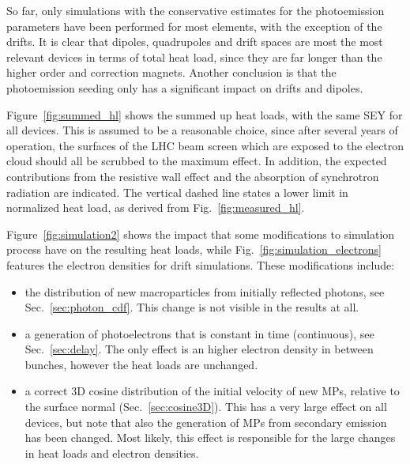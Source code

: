 So far, only simulations with the conservative estimates for the photoemission parameters have been performed for most elements, with the exception of the drifts.
It is clear that dipoles, quadrupoles and drift spaces are most the most relevant devices in terms of total heat load, since they are far longer than the higher order and correction magnets.
Another conclusion is that the photoemission seeding only has a significant impact on drifts and dipoles.

Figure~\ref{fig:summed_hl} shows the summed up heat loads, with the same SEY for all devices.
This is assumed to be a reasonable choice, since after several years of operation, the surfaces of the LHC beam screen which are exposed to the electron cloud should all be scrubbed to the maximum effect.
In addition, the expected contributions from the resistive wall effect and the absorption of synchrotron radiation are indicated.
The vertical dashed line states a lower limit in normalized heat load, as derived from Fig.~\ref{fig:measured_hl}.

Figure~\ref{fig:simulation2} shows the impact that some modifications to simulation process have on the resulting heat loads, while Fig.~\ref{fig:simulation_electrons} features the electron densities for drift simulations.
These modifications include:
\begin{itemize}
    \item the distribution of new macroparticles from initially reflected photons, see Sec.~\ref{sec:photon_cdf}.
        This change is not visible in the results at all.
    \item a generation of photoelectrons that is constant in time (continuous), see Sec.~\ref{sec:delay}.
        The only effect is an higher electron density in between bunches, however the heat loads are unchanged.
    \item a correct 3D cosine distribution of the initial velocity of new MPs, relative to the surface normal (Sec.~\ref{sec:cosine3D}).
        This has a very large effect on all devices, but note that also the generation of MPs from secondary emission has been changed.
        Most likely, this effect is responsible for the large changes in heat loads and electron densities.
\end{itemize}

